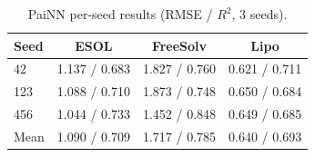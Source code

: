 \documentclass[sigconf]{acmart}
\newcommand{\rev}[1]{#1}
\begin{document}
\begin{table}[h!]
\caption{\rev{PaiNN per-seed results (RMSE / $R^2$, 3 seeds).}}
\label{tab:gnn_seeds}
\centering
\small
\begin{tabular}{@{}lccc@{}}
\toprule
Seed & ESOL & FreeSolv & Lipo \\
\midrule
42  & 1.137 / 0.683 & 1.827 / 0.760 & 0.621 / 0.711 \\
123 & 1.088 / 0.710 & 1.873 / 0.748 & 0.650 / 0.684 \\
456 & 1.044 / 0.733 & 1.452 / 0.848 & 0.649 / 0.685 \\
\midrule
Mean & 1.090 / 0.709 & 1.717 / 0.785 & 0.640 / 0.693 \\
\bottomrule
\end{tabular}
\end{table}
\clearpage
\end{document}
